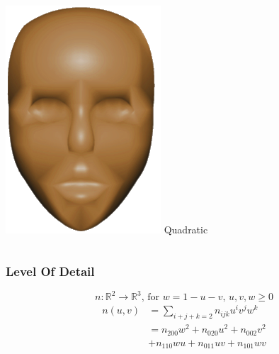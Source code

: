 \begin{frame}
\begin{columns}
\begin{column}{0.4\textwidth}
\begin{center}
					\includegraphics[width=\textwidth]{img/1_single/quadriticallyVaryingNormals.png}
					\small{Quadratic}
				\end{center}	
			\end{column}
		\end{columns}
	\end{frame}

	\begin{frame}
		\frametitle{Level Of Detail}
		\begin{equation*}
			n: \mathbb{R}^2 \rightarrow \mathbb{R}^3 \text{, for } w = 1 - u - v \text{, } u, v, w \geq 0 
		\end{equation*}
		\begin{equation*}
			\begin{aligned}
			n(u,v) & = \sum\limits_{i+j+k=2} n_{ijk} u^i v^j w^k\\
			& = n_{200} w^2 + n_{020} u^2 + n_{002} v^2\\
			& + n_{110} w u + n_{011} u v + n_{101} w v
			\end{aligned}
		\end{equation*}
	\end{frame}	

